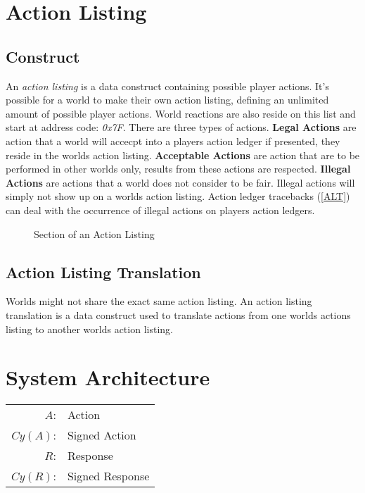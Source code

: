 \documentclass[runningheads,a4paper]{llncs}
\begin{document}
\section{Action Listing} 
\subsection{Construct}
An \textit{action listing} is a data construct containing possible player actions. It's possible for a world to make their own action listing, defining an unlimited amount of possible player actions. World reactions are also reside on this list and start at address code: \textit{0x7F}. There are three types of actions. \textbf{Legal Actions} are action that a world will accecpt into a players action ledger if presented, they reside in the worlds action listing. \textbf{Acceptable Actions} are action that are to be performed in other worlds only, results from these actions are respected. \textbf{Illegal Actions} are actions that a world does not consider to be fair. Illegal actions will simply not show up on a worlds action listing. Action ledger tracebacks (\ref{ALT}) can deal with the occurrence of illegal actions on players action ledgers. 

\begin{figure}
\caption{Section of an Action Listing}
\label{CodeAL}

\end{figure}

\subsection{Action Listing Translation}
Worlds might not share the exact same action listing. An action listing translation is a data construct used to translate actions from one worlds actions listing to another worlds action listing.

\section{System Architecture}
\begin{center}
\begin{tabular}{r l}
$A$: & Action\\ 
$Cy(A)$: & Signed Action\\
$R$: & Response\\ 
$Cy(R)$: & Signed Response\\

\end{tabular}
\end{center}
\end{document}
